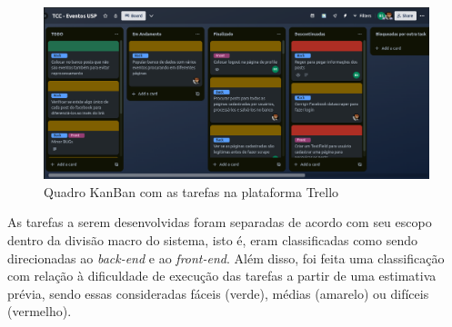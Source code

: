 \begin{figure}[h]
    \centering
    \includegraphics[width=1\textwidth]{figuras/trello.png}
    \caption{Quadro KanBan com as tarefas na plataforma Trello}
\end{figure}

\newpage

As tarefas a serem desenvolvidas foram separadas de acordo com seu escopo
dentro da divisão macro do sistema, isto é, eram classificadas como sendo
direcionadas ao \textit{back-end} e ao \textit{front-end}. Além disso, foi
feita uma classificação com relação à dificuldade de execução das tarefas a
partir de uma estimativa prévia, sendo essas consideradas fáceis (verde),
médias (amarelo) ou difíceis (vermelho).
